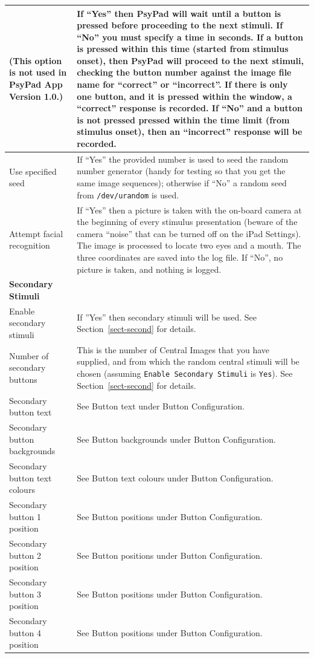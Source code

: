 \documentclass{article}
\begin{document}
\begin{longtable}{|p{5cm}|p{10cm}|}
\vspace{2ex}
(This option is not used in PsyPad App Version 1.0.) 
&
If ``Yes'' then PsyPad will wait until a button is pressed before proceeding to the next
stimuli.
If ``No'' you must specify a time in seconds. If a button is pressed 
within this time (started from stimulus onset),
then PsyPad will proceed to the next stimuli, checking the button number against the image file name for
``correct'' or ``incorrect''. If there is only one button, and it is pressed within the window, a ``correct'' response
is recorded.
If ``No'' and a button is not pressed pressed within the time limit (from stimulus onset), then 
an ``incorrect'' response will be recorded.\\
\hline
Use specified seed & If ``Yes'' the provided number is used to seed the random number generator (handy
for testing so that you get the same image sequences); otherwise if ``No'' a random seed from
{\tt /dev/urandom} is used.\\
\hline
Attempt facial recognition & If ``Yes'' then a picture is taken with the on-board camera at the
beginning of every stimulus presentation (beware of the camera ``noise'' that can be turned off on the
iPad Settings). The image is processed to locate two eyes and a mouth. The three coordinates are saved
into the log file. If ``No'', no picture is taken, and nothing is logged.\\
\hline
\hline
{\bf Secondary Stimuli} & \\\nopagebreak
Enable secondary stimuli & If ''Yes'' then secondary stimuli will be used. See
Section~\ref{sect-second} for details. \\ 
\hline
Number of secondary buttons    & This is the number of Central Images that you
have supplied, and from which the random central stimuli will be chosen (assuming
{\tt Enable Secondary Stimuli} is {\tt Yes}). See Section~\ref{sect-second} for
details. \\
\hline
Secondary button text          & See Button text under Button Configuration. \\
Secondary button backgrounds   & See Button backgrounds under Button Configuration. \\
Secondary button text colours  & See Button text colours under Button Configuration. \\
Secondary button 1 position  & See Button positions under Button Configuration. \\
Secondary button 2 position  & See Button positions under Button Configuration. \\
Secondary button 3 position  & See Button positions under Button Configuration. \\
Secondary button 4 position  & See Button positions under Button Configuration. \\
\hline
\end{longtable}
\end{document}
